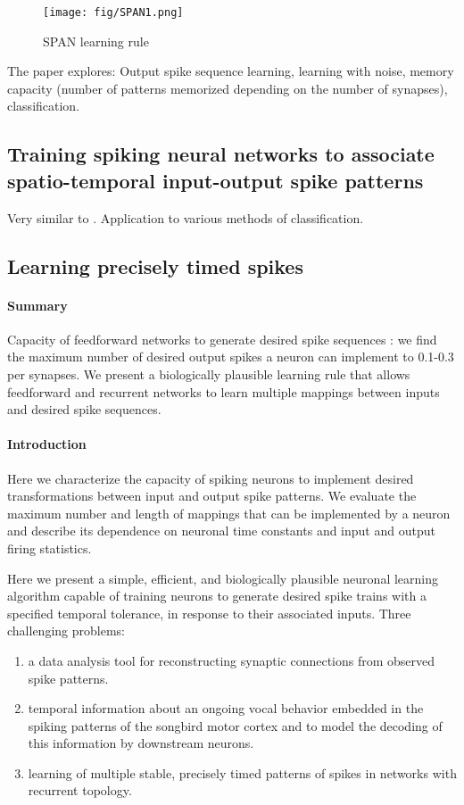 \documentclass[12pt]{article}
\begin{document}
\begin{figure}
\center
\texttt{[image: fig/SPAN1.png]}
\caption{SPAN learning rule}
\label{SPAN1}
\end{figure}

The paper explores: Output spike sequence learning, learning with noise, memory capacity (number of patterns memorized depending on the number of synapses), classification.

\subsection{Training spiking neural networks to associate spatio-temporal input-output spike patterns \cite{mohemmed2013training}}

Very similar to \cite{mohemmed2012span}. Application to various methods of classification.

\subsection{Learning precisely timed spikes \cite{memmesheimer2014learning}}

\paragraph{Summary} Capacity of feedforward networks to generate desired spike sequences : we find the maximum number of desired output spikes a neuron can implement to 0.1-0.3 per synapses. We present  a biologically plausible learning rule that allows feedforward and recurrent networks to learn multiple mappings between inputs and desired spike sequences.

\paragraph{Introduction} Here we characterize the capacity of spiking neurons to implement desired transformations between input and output spike patterns. We evaluate the maximum number and length of mappings that can be implemented by a neuron and describe its dependence on neuronal time constants and input and output firing statistics.

Here we present a simple, efficient, and biologically plausible neuronal learning algorithm capable of training neurons to generate desired spike trains with a specified temporal tolerance, in response to their associated inputs. Three challenging problems: \begin{enumerate}
\item a data analysis tool for reconstructing synaptic connections from observed spike patterns.
\item temporal information about an ongoing vocal behavior embedded in the spiking patterns of the songbird motor cortex and to model the decoding of this information by downstream neurons. 
\item learning of multiple stable, precisely timed patterns of spikes in networks with recurrent topology.
\end{enumerate}
\end{document}
